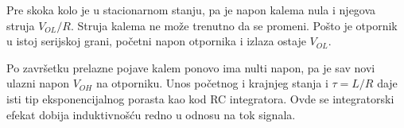 Pre skoka kolo je u stacionarnom stanju, pa je napon kalema nula i njegova struja $V_{OL}/R$. Struja kalema ne može trenutno da se promeni. Pošto je otpornik u istoj serijskoj grani, početni napon otpornika i izlaza ostaje $V_{OL}$.

Po završetku prelazne pojave kalem ponovo ima nulti napon, pa je sav novi ulazni napon $V_{OH}$ na otporniku. Unos početnog i krajnjeg stanja i $\tau=L/R$ daje isti tip eksponencijalnog porasta kao kod RC integratora. Ovde se integratorski efekat dobija induktivnošću redno u odnosu na tok signala.
